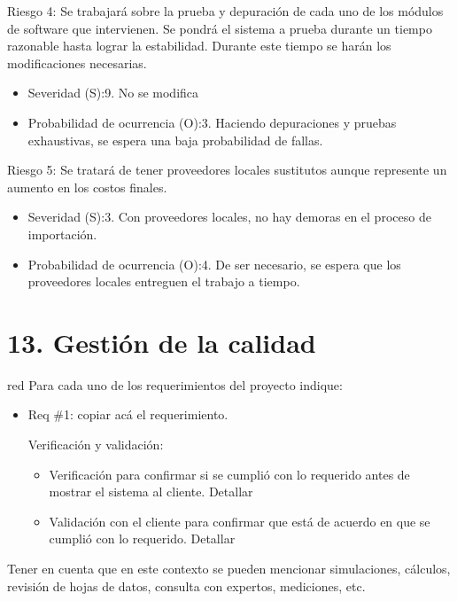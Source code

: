 \documentclass[11pt]{charter}
\begin{document}
Riesgo 4: Se trabajará sobre la prueba y depuración de cada uno de los módulos de software que intervienen. Se pondrá el sistema a prueba durante un tiempo razonable hasta lograr la estabilidad. Durante este tiempo se harán los modificaciones necesarias.
\begin{itemize}
\item Severidad (S):9. No se modifica
\item Probabilidad de ocurrencia (O):3. Haciendo depuraciones y pruebas exhaustivas, se espera una baja probabilidad de fallas.
\end{itemize}

Riesgo 5:  Se tratará de tener  proveedores locales sustitutos aunque represente un aumento en los costos finales. 
\begin{itemize}
\item Severidad (S):3. Con proveedores locales, no hay demoras en el proceso de importación.
\item Probabilidad de ocurrencia (O):4. De ser necesario, se espera que los proveedores locales entreguen el trabajo a tiempo.
\end{itemize}



\section{13. Gestión de la calidad}
\label{sec:calidad}

\begin{consigna}{red}
Para cada uno de los requerimientos del proyecto indique:
\begin{itemize} 
\item Req \#1: copiar acá el requerimiento.

Verificación y validación:

\begin{itemize}
\item Verificación para confirmar si se cumplió con lo requerido antes de mostrar el sistema al cliente. Detallar 
\item Validación con el cliente para confirmar que está de acuerdo en que se cumplió con lo requerido. Detallar  
\end{itemize}

\end{itemize}

Tener en cuenta que en este contexto se pueden mencionar simulaciones, cálculos, revisión de hojas de datos, consulta con expertos, mediciones, etc.

\end{consigna}
\end{document}
